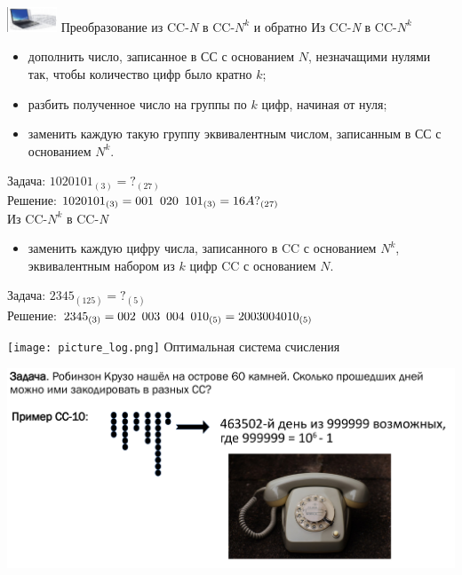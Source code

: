 \documentclass{beamer}
\begin{document}
\begin{frame}{\includegraphics[width=4em]{picture_logo.png} Преобразование из CC-\textit{N} в CC-$N^k$  и обратно}
\textcolor[RGB]{57, 255, 20}{Из CC-\textit{N} в CC-$N^k$}\\
\begin{itemize}
  \item дополнить число, записанное в СС с основанием $N$, незначащими нулями так, чтобы количество цифр было кратно $k$;
  \item разбить полученное число на группы по $k$ цифр, начиная от нуля;
  \item заменить каждую такую группу эквивалентным числом, записанным в СС с основанием $N^k$.
\end{itemize}

Задача: $1020101_{(3)} = ?_{(27)}$\\
Решение: $1020101_{(3)} = 001\hphantom1020\hphantom1101_{(3)} = 16A?_{(27)}$\\
\vspace{1em}
\textcolor[RGB]{57, 255, 20}{Из CC-$N^k$ в CC-\textit{N}}\\
\begin{itemize}
    \item  заменить каждую цифру числа, записанного в CC с основанием $N^k$, эквивалентным набором из $k$ цифр CC с основанием $N$.
\end{itemize}
Задача: $2345_{(125)} = ?_{(5)}$\\
Решение: $2345_{(3)} = 002\hphantom1003\hphantom1004\hphantom1010_{(5)} = 2003004010_{(5)}$\\
\end{frame}

\begin{frame}{\texttt{[image: picture\_log.png]} Оптимальная система счисления}
\begin{center}
    \includegraphics[width=\columnwidth]{33.png}
\end{center}
\end{frame}
\end{document}

